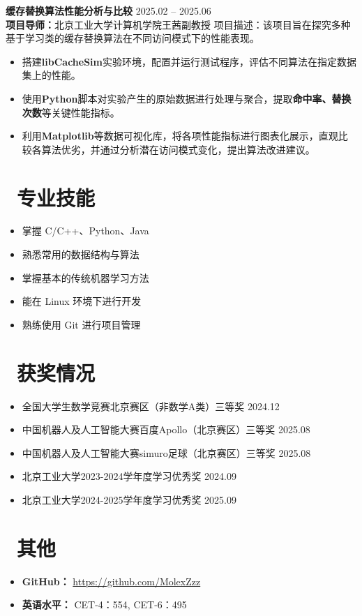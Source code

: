 \documentclass[11pt]{article}
\newlength{\intraProjectTitleSep}
\newcommand{\titlebreak}{\\[\intraProjectTitleSep]}
\newlength{\intraProjectListTopSep}
\begin{document}
    \textbf{缓存替换算法性能分析与比较} \hfill 2025.02 -- 2025.06 \titlebreak
    \textbf{项目导师：}北京工业大学计算机学院王茜副教授
    项目描述：该项目旨在探究多种基于学习类的缓存替换算法在不同访问模式下的性能表现。
    \begin{itemize}[nosep, topsep=\intraProjectListTopSep]
        \item 搭建\textbf{libCacheSim}实验环境，配置并运行测试程序，评估不同算法在指定数据集上的性能。
        \item 使用\textbf{Python}脚本对实验产生的原始数据进行处理与聚合，提取\textbf{命中率、替换次数}等关键性能指标。
        \item 利用\textbf{Matplotlib}等数据可视化库，将各项性能指标进行图表化展示，直观比较各算法优劣，并通过分析潜在访问模式变化，提出算法改进建议。
    \end{itemize}
    
\section{\makebox[\widthof{\faCogs}][c]{\color{CVBlue}\faCogs}\ 专业技能}
\begin{itemize}[nosep]
    \item 掌握 C/C++、Python、Java
    \item 熟悉常用的数据结构与算法
    \item 掌握基本的传统机器学习方法
    \item 能在 Linux 环境下进行开发
    \item 熟练使用 Git 进行项目管理
\end{itemize}
\section{\makebox[\widthof{\faGraduationCap}][c]{\color{CVBlue}\faList}\ 获奖情况}
\begin{itemize}[nosep]
    \item 全国大学生数学竞赛北京赛区（非数学A类）三等奖 \hfill 2024.12
    \item 中国机器人及人工智能大赛百度Apollo（北京赛区）三等奖 \hfill 2025.08
    \item 中国机器人及人工智能大赛simuro足球（北京赛区）三等奖 \hfill 2025.08
    \item 北京工业大学2023-2024学年度学习优秀奖 \hfill 2024.09
    \item 北京工业大学2024-2025学年度学习优秀奖 \hfill 2025.09
\end{itemize}
    
\section{\makebox[\widthof{\faInfo}][c]{\color{CVBlue}\faInfo}\ 其他}
\begin{itemize}[parsep=0.5ex]
    \item \textbf{GitHub：} \href{https://github.com/MolexZzz}{https://github.com/MolexZzz} 
    \item \textbf{英语水平：} CET-4：554, CET-6：495
\end{itemize}
\end{document}
